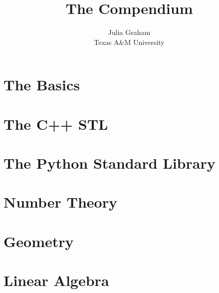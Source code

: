 \documentclass{report}
\title{The Compendium}
\author{
  {Julia Graham}\\	
  {Texas A\&M University}
}
\begin{document}
\maketitle

\tableofcontents

\chapter{The Basics}


\chapter{The C++ STL}


\chapter{The Python Standard Library}


\chapter{Number Theory}


\chapter{Geometry}


\chapter{Linear Algebra}
\end{document}

